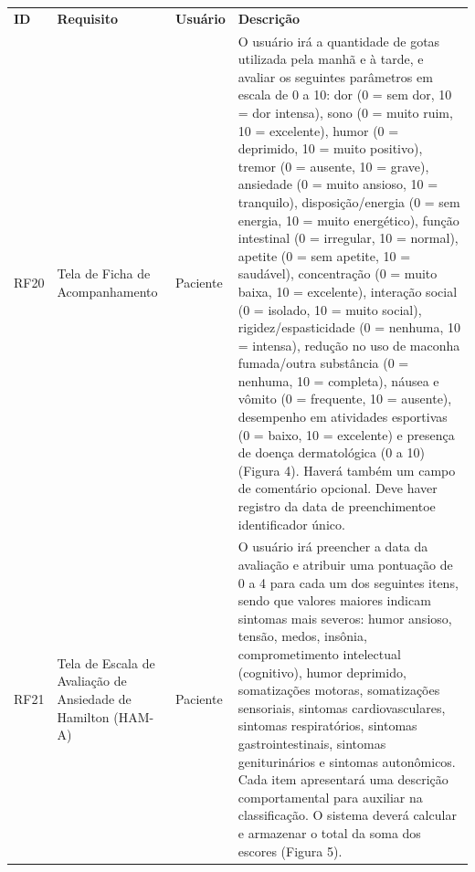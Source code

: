 \href{}{}\documentclass[12pt,portuguese,oneside]{article}
\begin{document}
\newpage

\begin{table}[H]
\centering
{}
\begin{tabularx}{\textwidth}{|>{\raggedright\arraybackslash}p{1cm}|>{\raggedright\arraybackslash}p{3cm}|>{\raggedright\arraybackslash}p{2cm}|>{\raggedright\arraybackslash}X|}
\hline
\rowcolor{gray!20}
\textbf{ID} & \textbf{Requisito} & \textbf{Usuário} & \textbf{Descrição}\\
RF20 & Tela de Ficha de Acompanhamento & Paciente & O usuário irá a quantidade de gotas utilizada pela manhã e à tarde, e avaliar os seguintes parâmetros em escala de 0 a 10: dor (0 = sem dor, 10 = dor intensa), sono (0 = muito ruim, 10 = excelente), humor (0 = deprimido, 10 = muito positivo), tremor (0 = ausente, 10 = grave), ansiedade (0 = muito ansioso, 10 = tranquilo), disposição/energia (0 = sem energia, 10 = muito energético), função intestinal (0 = irregular, 10 = normal), apetite (0 = sem apetite, 10 = saudável), concentração (0 = muito baixa, 10 = excelente), interação social (0 = isolado, 10 = muito social), rigidez/espasticidade (0 = nenhuma, 10 = intensa), redução no uso de maconha fumada/outra substância (0 = nenhuma, 10 = completa), náusea e vômito (0 = frequente, 10 = ausente), desempenho em atividades esportivas (0 = baixo, 10 = excelente) e presença de doença dermatológica (0 a 10) (Figura 4). Haverá também um campo de comentário opcional. Deve haver registro da data de preenchimentoe identificador único. \\
\hline
RF21 & Tela de Escala de Avaliação de Ansiedade de Hamilton (HAM-A) & Paciente & O usuário irá preencher a data da avaliação e atribuir uma pontuação de 0 a 4 para cada um dos seguintes itens, sendo que valores maiores indicam sintomas mais severos: humor ansioso, tensão, medos, insônia, comprometimento intelectual (cognitivo), humor deprimido, somatizações motoras, somatizações sensoriais, sintomas cardiovasculares, sintomas respiratórios, sintomas gastrointestinais, sintomas geniturinários e sintomas autonômicos. Cada item apresentará uma descrição comportamental para auxiliar na classificação. O sistema deverá calcular e armazenar o total da soma dos escores (Figura 5).\\
\hline
\end{tabularx}
\end{table}

\newpage
\end{document}
